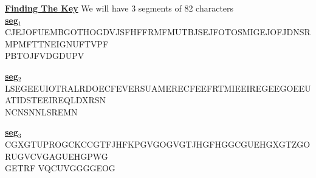 \newpage
\textbf{\underline{Finding The Key}} We will have 3 segments of 82 characters\\[0.25cm]
\textbf{\underline{seg\(_1\)}}\\[0.15cm]
CJEJOFUEMBGOTHOGDVJSFHFFRMFMUTBJSEJFOTOSMIGEJOFJDNSRMPMFTTNEIGNUFTVPF\\
PBTOJFVDGDUPV

\vspace{0.25cm}
\textbf{\underline{seg\(_2\)}}\\[0.15cm]
LSEGEEUIOTRALRDOECFEVERSUAMERECFEEFRTMIEEIREGEEGOEEUATIDSTEEIREQLDXRSN\\
NCNSNNLSREMN

\vspace{0.25cm}
\textbf{\underline{seg\(_3\)}}\\[0.15cm]
CGXGTUPROGCKCCGTFJHFKPGVGOGVGTJHGFHGGCGUEHGXGTZGORUGVCVGAGUEHGPWG\\GETRF
VQCUVGGGGEOG


